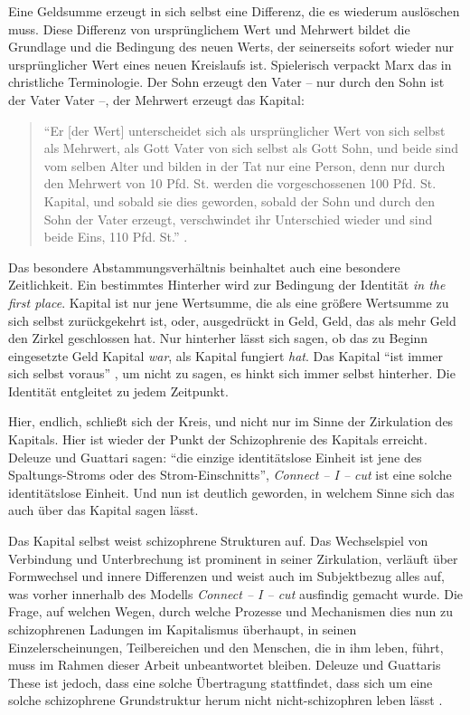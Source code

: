 \documentclass[12pt,
               paper=a4,
               twoside=false,
               onehalfspacing,
               bibliography=totoc,
               toc=graduated,
               ]{scrartcl}
\newcommand{\pc}[2]{\parencite[#1]{#2}}
\newcommand{\vgl}[2]{\parencite[vgl.][#1]{#2}}
\newcommand{\cic}{Connect -- I -- cut\xspace}
\newcommand{\dg}{Deleuze und Guattari\xspace}
\begin{document}
Eine Geldsumme erzeugt in sich selbst eine Differenz, die es wiederum
auslöschen muss. Diese Differenz von ursprünglichem Wert und Mehrwert
bildet die Grundlage und die Bedingung des neuen Werts, der
seinerseits sofort wieder nur \glq ursprünglicher\grq{} Wert eines
neuen Kreislaufs ist. Spielerisch verpackt Marx das in christliche
Terminologie. Der Sohn erzeugt den Vater -- nur durch den Sohn ist der
Vater Vater --, der Mehrwert erzeugt das Kapital:
%
\begin{spacing}{1}
\begin{quote}
"`Er [der Wert] unterscheidet sich als ursprünglicher
Wert von sich selbst als Mehrwert, als Gott Vater von sich selbst als
Gott Sohn, und beide sind vom selben Alter und bilden in der Tat nur
eine Person, denn nur durch den Mehrwert von 10 Pfd. St. werden die
vorgeschossenen 100 Pfd. St. Kapital, und sobald sie dies geworden,
sobald der Sohn und durch den Sohn der Vater erzeugt, verschwindet ihr
Unterschied wieder und sind beide Eins, 110 Pfd. St."' \pc{S. 169
f.}{kap}.
\end{quote}
\end{spacing}

Das besondere Abstammungsverhältnis beinhaltet auch eine besondere
Zeitlichkeit. Ein bestimmtes \glq Hinterher\grq{} wird zur Bedingung
der Identität \emph{in the first place}. Kapital ist nur jene
Wertsumme, die als eine größere Wertsumme zu sich selbst zurückgekehrt
ist, oder, ausgedrückt in Geld, Geld, das als mehr Geld den Zirkel
geschlossen hat. Nur hinterher lässt sich sagen, ob das zu Beginn
eingesetzte Geld Kapital \emph{war}, als Kapital fungiert \emph{hat}.
Das Kapital "`ist immer sich selbst voraus"' \pc{125}{strauss}, um
nicht zu sagen, es hinkt sich immer selbst hinterher. Die Identität
entgleitet zu jedem Zeitpunkt.

Hier, endlich, schließt sich der Kreis, und nicht nur im Sinne der
Zirkulation des Kapitals. Hier ist wieder der Punkt der Schizophrenie
des Kapitals erreicht. \dg sagen: "`die einzige identitätslose Einheit
ist jene des Spaltungs-Stroms oder des Strom-Einschnitts"',
\emph{\cic} ist eine solche identitätslose Einheit. Und nun ist
deutlich geworden, in welchem Sinne sich das auch über das Kapital
sagen lässt.

Das Kapital selbst weist schizophrene Strukturen auf. Das Wechselspiel
von Verbindung und Unterbrechung ist prominent in seiner Zirkulation,
verläuft über Formwechsel und innere Differenzen und weist auch im
Subjektbezug alles auf, was vorher innerhalb des Modells \emph{\cic}
ausfindig gemacht wurde. Die Frage, auf welchen Wegen, durch welche
Prozesse und Mechanismen dies nun zu schizophrenen Ladungen im
Kapitalismus überhaupt, in seinen Einzelerscheinungen, Teilbereichen
und den Menschen, die in ihm leben, führt, muss im Rahmen dieser Arbeit
unbeantwortet bleiben. Deleuze und Guattaris These ist jedoch, dass
eine solche Übertragung stattfindet, dass sich um eine solche
schizophrene Grundstruktur herum nicht nicht-schizophren leben lässt
\vgl{S. 315 f.}{ao}.
\end{document}
